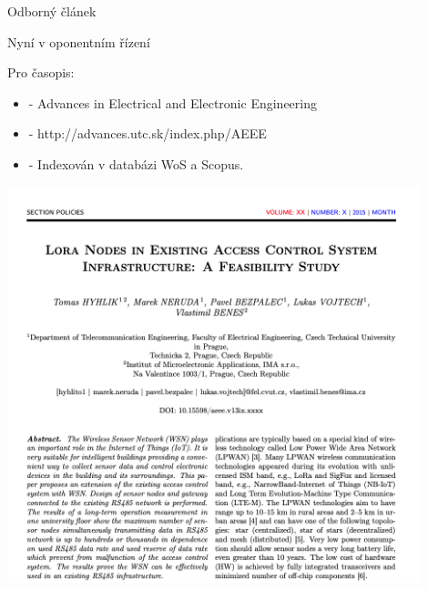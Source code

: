 \documentclass{beamer}
\begin{document}
\begin{frame}{Odborný článek}
	
	Nyní v oponentním řízení

	Pro časopis:
	\begin{itemize}
		\item 	- Advances in Electrical and Electronic Engineering
		\item 	- http://advances.utc.sk/index.php/AEEE
		\item 	- Indexován v databázi WoS a Scopus.
	\end{itemize}


\end{frame}


\begin{frame}
	\centering
\includegraphics[width=0.9\textwidth]{Screenshot_odbornyClanek_1}
\end{frame}
\end{document}

